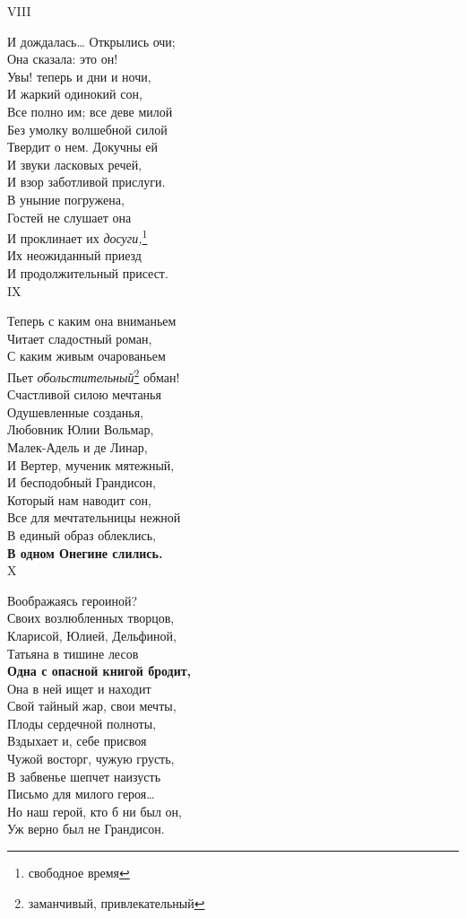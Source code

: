VIII

И дождалась… Открылись очи;\\
Она сказала: это он!\\
Увы! теперь и дни и ночи,\\
И жаркий одинокий сон,\\
Все полно им; все деве милой\\
Без умолку волшебной силой\\
Твердит о нем. Докучны ей\\
И звуки ласковых речей,\\
И взор заботливой прислуги.\\
В уныние погружена,\\
Гостей не слушает она\\
И проклинает их \emph{досуги,}\footnote{свободное время}\\
Их неожиданный приезд\\
И продолжительный присест.\\

IX

Теперь с каким она вниманьем\\
Читает сладостный роман,\\
С каким живым очарованьем\\
Пьет \emph{обольстительный}\footnote{заманчивый, привлекательный} обман!\\
Счастливой силою мечтанья\\
Одушевленные созданья,\\
Любовник Юлии Вольмар,\\
Малек-Адель и де Линар,\\
И Вертер, мученик мятежный,\\
И бесподобный Грандисон,\\%
Который нам наводит сон,\\
Все для мечтательницы нежной\\
В единый образ облеклись,\\
\textbf{В одном Онегине слились.}\\

X

Воображаясь героиной?\\
Своих возлюбленных творцов,\\
Кларисой, Юлией, Дельфиной,\\
Татьяна в тишине лесов\\
\textbf{Одна с опасной книгой бродит,}\\
Она в ней ищет и находит\\
Свой тайный жар, свои мечты,\\
Плоды сердечной полноты,\\
Вздыхает и, себе присвоя\\
Чужой восторг, чужую грусть,\\
В забвенье шепчет наизусть\\
Письмо для милого героя…\\
Но наш герой, кто б ни был он,\\
Уж верно был не Грандисон.\\

